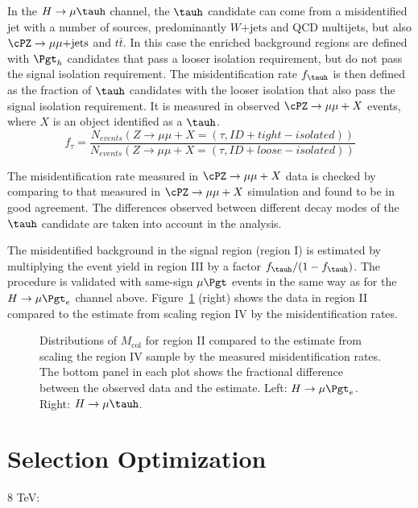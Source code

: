 In the $H \rightarrow \mu \tauh$ channel, the $\tauh$ candidate can come from a  misidentified
jet with a number of sources, predominantly  $W\mathrm{+jets}$ and QCD multijets,
but also $\cPZ \rightarrow \mu \mu\text{+jets}$ and $t\bar{t}$. In this case the enriched background
regions are defined with $\Pgt_h$ candidates that pass a looser isolation requirement, but do not pass the
signal isolation requirement. The misidentification rate $f_{\tauh}$ is then defined as the fraction of $\tauh$ candidates with
the looser isolation that also pass the signal isolation requirement. It is measured in
observed  $\cPZ \rightarrow \mu \mu +X$ events, where $X$ is
an object identified as a $\tauh$.
\begin{equation}
f_{\tau}= \frac{N_{events}(Z \rightarrow \mu \mu +X=(\tau, ID+tight-isolated))}
               {N_{events}(Z \rightarrow \mu \mu +X=(\tau, ID+loose-isolated))}
\end{equation}

The misidentification rate  measured in  $\cPZ \rightarrow \mu \mu  +X$ data is checked by comparing to that
measured in $\cPZ \rightarrow \mu \mu +X$ simulation and found to be in good agreement.
The differences observed between different decay modes of the  $\tauh$ candidate are taken
into account in the analysis.

The misidentified background in the signal region (region I) is estimated by multiplying
the event yield in region III by a factor $f_{\tauh}/(1-f_{\tauh})$.
The procedure is validated with same-sign $\mu\Pgt$ events in the same way as
for the $H \rightarrow \mu \Pgt_{e}$ channel above. Figure~\ref{fig:samesign_fakes} (right) shows
the data  in region II compared to the estimate from scaling
region IV by the misidentification rates.


\begin{figure}[hbtp]\centering
\caption{Distributions of $M_\text{col}$ for region II compared to the estimate
from scaling the region IV sample by the measured misidentification rates. The bottom panel in each plot shows the fractional difference between the observed data and the estimate. Left:  $H \rightarrow \mu \Pgt_{e}$. Right: $H \rightarrow \mu \tauh$. }
\label{fig:samesign_fakes}\end{figure}


\section{Selection Optimization}
8 TeV:

